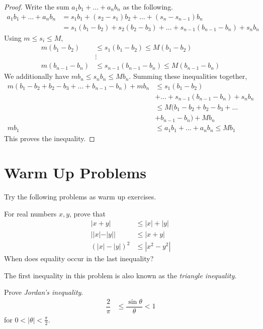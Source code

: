 \documentclass{subfile}
\begin{document}
		\begin{proof}
			Write the sum $a_1b_1+\ldots+a_nb_n$ as the following.
				\begin{align*}
					a_1b_1+\ldots+a_nb_n
						& = s_1b_1+(s_2-s_1)b_2+\ldots+(s_n-s_{n-1})b_n\\
						& = s_1(b_1-b_2)+s_2(b_2-b_3)+\ldots+s_{n-1}(b_{n-1}-b_n)+s_nb_n
				\end{align*}
			Using $m\leq s_i\leq M$,
				\begin{align*}
					m(b_1-b_2)
						& \leq s_1(b_1-b_2) \leq M(b_1-b_2)\\
						& \vdots\\
					m(b_{n-1}-b_{n})
						& \leq s_{n-1}(b_{n-1}-b_n)\leq M(b_{n-1}-b_n)
				\end{align*}
			We additionally have $mb_n\leq s_nb_n\leq Mb_n$. Summing these inequalities together,
				\begin{align*}
					m(b_1-b_2+b_2-b_3+\ldots+b_{n-1}-b_n)+mb_n
						& \leq s_1(b_1-b_2)\\
						& +\ldots+s_{n-1}(b_{n-1}-b_n)+s_nb_n\\
						& \leq M(b_1-b_2+b_2-b_3+\ldots\\
						& +b_{n-1}-b_n)+Mb_n\\
					mb_1
						& \leq a_1b_1+\ldots+a_nb_n\leq Mb_1
				\end{align*}
			This proves the inequality.
		\end{proof}
	\section{Warm Up Problems}
	Try the following problems as warm up exercises.
		\begin{problem}
			For real numbers $x,y$, prove that
				\begin{align*}
					|x+y|
						& \leq|x|+|y|\\
					||x|-|y||
						& \leq|x+y|\\
					(|x|-|y|)^2
						& \leq|x^2-y^2|
				\end{align*}
			When does equality occur in the last inequality?
		\end{problem}
	The first inequality in this problem is also known as the \textit{triangle inequality}.
		\begin{problem}
			Prove \textit{Jordan's inequality}.
				\begin{align*}
					\dfrac{2}{\pi}
						& \leq\dfrac{\sin{\theta}}{\theta}<1
				\end{align*}
			for $0<|\theta|<\frac{\pi}{2}$.
		\end{problem}
	
\end{document}
